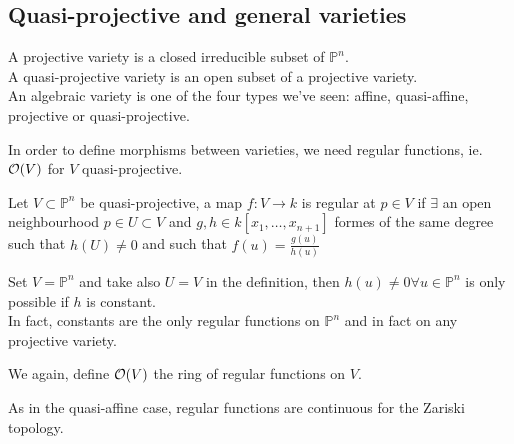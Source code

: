 \documentclass[../main.tex]{subfiles}
\begin{document}
\subsection{Quasi-projective and general varieties}
\begin{defn}
	A projective variety is a closed irreducible subset of $ \mathbb{P}^{n}$.\\
	A quasi-projective variety is an open subset of a projective variety.\\
	An algebraic variety is one of the four types we've seen: affine, quasi-affine, projective or quasi-projective.	
\end{defn}
\begin{rmq}
In order to define morphisms between varieties, we need regular functions, ie. $ \mathcal{O} ( V) $ for $V$ quasi-projective.
\end{rmq}
\begin{defn}
	Let $ V \subset \mathbb{P}^{n}$ be quasi-projective, a map $f: V\to k$ is regular at $p\in V$ if $\exists$ an open neighbourhood $p\in U \subset V$ and $g,h \in k[x_1,\ldots,x_{n+1} ]$ formes of the same degree such that $h( U) \neq 0$ and such that $f( u) = \frac{g( u) }{h( u) }$  
\end{defn}
\begin{exemple}
Set $V= \mathbb{P}^{n}$ and take also $U=V$ in the definition, then $h( u) \neq 0 \forall u \in \mathbb{P}^{n}$ is only possible if $h$ is constant.\\
In fact, constants are the only regular functions on $ \mathbb{P}^{n}$ and in fact on any projective variety.
\end{exemple}
\begin{defn}
	We again, define $ \mathcal{O} ( V) $ the ring of regular functions on $V$.\\
\end{defn}
\begin{rmq}
As in the quasi-affine case, regular functions are continuous for the Zariski topology.
\end{rmq}
\end{document}
